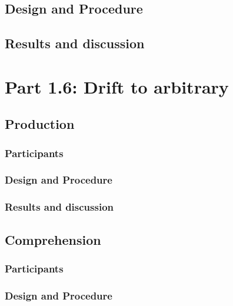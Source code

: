 \documentclass[man]{apa6}
\theoremstyle{definition}
\theoremstyle{definition}
\theoremstyle{definition}
\theoremstyle{remark}
\begin{document}
\subsection{Design and Procedure}\label{design-and-procedure-4}

\subsection{Results and discussion}\label{results-and-discussion-4}

\section{Part 1.6: Drift to
arbitrary}\label{part-1.6-drift-to-arbitrary}

\subsection{Production}\label{production}

\subsubsection{Participants}\label{participants-5}

\subsubsection{Design and Procedure}\label{design-and-procedure-5}

\subsubsection{Results and discussion}\label{results-and-discussion-5}

\subsection{Comprehension}\label{comprehension}

\subsubsection{Participants}\label{participants-6}

\subsubsection{Design and Procedure}\label{design-and-procedure-6}
\end{document}
